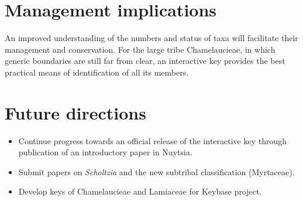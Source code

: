 \documentclass[version=last,
    paper=a4, %
    10pt, %
    usenames,
    dvipsnames,
    oneside, %
    headings=openany, %
    DIV=15 %
]{scrbook}
\begin{document}
\section*{Management implications}
An improved understanding of the numbers and status of taxa will
facilitate their management and conservation. For the large tribe
Chamelaucieae, in which generic boundaries are still far from clear, an
interactive key provides the best practical means of identification of
all its members.



\section*{Future directions}
\begin{itemize}
\itemsep1pt\parskip0pt
\item
  Continue progress towards an official release of the interactive key
  through publication of an introductory paper in Nuytsia.
\item
  Submit papers on \emph{Scholtzia} and the new subtribal classification
  (Myrtaceae).
\item
  Develop keys of Chamelaucieae and Lamiaceae for Keybase project.
\end{itemize}



\end{document}
